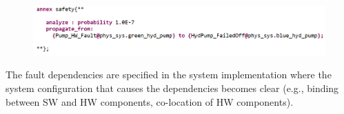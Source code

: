 \begin{figure}[h!]
	\vspace{-0.2in}
	\begin{center}
		\includegraphics[width=1.0\textwidth]{images/hw_prop_stmt.png}
	\end{center}
	\vspace{-0.3in}
	\label{fig:hwFaultProp}
	\vspace{-0.1in}
\end{figure}

The fault dependencies are specified in the system implementation where the system configuration that causes the dependencies becomes clear (e.g., binding between SW and HW components, co-location of HW components). 


